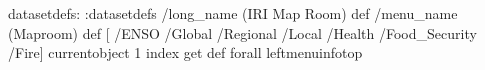 \begin{ingrid}
datasetdefs:
:datasetdefs
/long_name (IRI Map Room) def
/menu_name (Maproom) def
[ /ENSO /Global /Regional /Local /Health /Food_Security /Fire]
{ currentobject 1 index get  def} forall
leftmenuinfotop
\end{ingrid}
